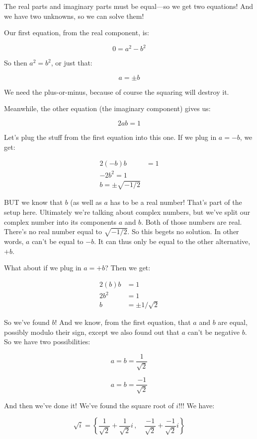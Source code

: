 \documentclass[
]{article}
\begin{document}
The real parts and imaginary parts must be equal---so we get two
equations! And we have two unknowns, so we can solve them!

Our first equation, from the real component, is:

\[0 = a^2-b^2\]

So then \(a^2=b^2\), or just that:

\[a = \pm b\]

We need the plus-or-minus, because of course the squaring will destroy
it.

Meanwhile, the other equation (the imaginary component) gives us:

\[2ab = 1\]

Let's plug the stuff from the first equation into this one. If we plug
in \(a=-b\), we get:

\[
\begin{align*}
2(-b)b &= 1 \\
-2b^2 = 1 \\
b = \pm \sqrt{-1/2}
\end{align*}
\]

BUT we know that \(b\) (as well as \(a\) has to be a real number! That's
part of the setup here. Ultimately we're talking about complex numbers,
but we've split our complex number into its components \(a\) and \(b\).
Both of those numbers are real. There's no real number equal to
\(\sqrt{-1/2}\). So this begets no solution. In other words, \(a\) can't
be equal to \(-b\). It can thus only be equal to the other alternative,
\(+b\).

What about if we plug in \(a=+b\)? Then we get:

\[
\begin{align*}
2(b)b &= 1 \\
2b^2 &= 1 \\
b &= \pm 1/\sqrt{2}
\end{align*}
\]

So we've found \(b\)! And we know, from the first equation, that \(a\)
and \(b\) are equal, possibly modulo their sign, except we also found
out that \(a\) can't be negative \(b\). So we have two possibilities:

\[a = b = \frac{1}{\sqrt{2}}\]

\[a = b = \frac{-1}{\sqrt{2}}\]

And then we've done it! We've found the square root of \(i\)!!! We have:

\[\sqrt{i} = \left\{ \frac{1}{\sqrt{2}}+\frac{1}{\sqrt{2}}i \,,\quad \frac{-1}{\sqrt{2}}+\frac{-1}{\sqrt{2}}i \right\}\]
\end{document}
